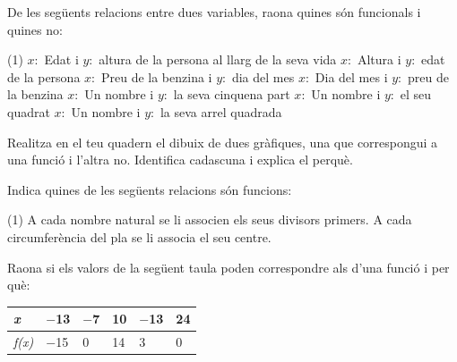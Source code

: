 \begin{mylist}
 
\exer \mental De les següents relacions entre dues variables, raona quines són funcionals i quines no:
\begin{tasks}(1)
   \task $x:$ Edat i $y:$ altura de la persona al llarg de la seva vida \hspace{1cm} \dotfill \hspace{1cm}
   \task $x:$ Altura i $y:$ edat de la persona \hspace{1cm} \dotfill \hspace{1cm}
   \task $x:$ Preu de la benzina i $y:$ dia del mes \hspace{1cm} \dotfill \hspace{1cm}
   \task $x:$ Dia del mes i $y:$ preu de la benzina \hspace{1cm} \dotfill \hspace{1cm}
   \task $x:$ Un nombre i $y:$ la seva cinquena part \hspace{1cm} \dotfill \hspace{1cm}
   \task $x:$ Un nombre i $y:$ el seu quadrat \hspace{1cm} \dotfill \hspace{1cm}
   \task $x:$ Un nombre i $y:$ la seva arrel quadrada \hspace{1cm} \dotfill \hspace{1cm}
\end{tasks}

\answers{[Sí, No, No, Sí, Sí, Sí, No]}

\exer  Realitza en el teu quadern el dibuix de dues gràfiques, una que correspongui a una funció i l'altra no. Identifica cadascuna i explica el perquè. 


\exer  Indica quines de les següents relacions són funcions:
\begin{tasks}(1)
	\task    A cada nombre natural se li associen els seus divisors primers.
	\task   A cada circumferència del pla se li associa el seu centre.
\end{tasks}


\exer  Raona si els valors de la següent taula poden correspondre als d'una funció i per què:


\begin{longtable}{|p{0.4in}|p{0.4in}|p{0.4in}|p{0.4in}|p{0.4in}|p{0.4in}|} \hline 
\cellcolor{lightgray}	\textit{x} & $-$13 & $-$7 & 10 & $-$13 & 24 \\ \hline 
\cellcolor{lightgray}	\textit{f(x)} & $-$15 & 0 & 14 & 3 & 0 \\ \hline 
\end{longtable}


\end{mylist}
